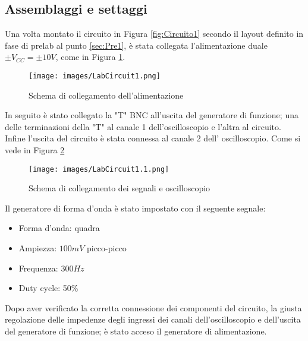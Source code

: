 \subsection{Assemblaggi e settaggi}
Una volta montato il circuito in Figura \ref{fig:Circuito1} secondo il layout definito in fase di prelab al punto \ref{sec:Pre1}, è stata collegata l'alimentazione duale $\pm V_{CC}=\pm10V$, come in Figura \ref{fig:Alimentazione1}. \\
\begin{figure}[H]
    \centering
    \texttt{[image: images/LabCircuit1.png]}
    \caption{Schema di collegamento dell'alimentazione}
    \label{fig:Alimentazione1}
\end{figure}
In seguito è stato collegato la "T" BNC all’uscita del generatore di funzione; una delle terminazioni della "T" al canale 1 dell'oscilloscopio e l'altra al circuito. Infine l'uscita del circuito è stata connessa  al canale 2 dell' oscilloscopio. Come si vede in Figura \ref{fig:LabCircuit1}
\begin{figure}[H]
    \centering
    \texttt{[image: images/LabCircuit1.1.png]}
    \caption{Schema di collegamento dei segnali e oscilloscopio}
    \label{fig:LabCircuit1}
\end{figure}
Il generatore di forma d'onda è stato impostato con il seguente segnale:
\begin{itemize}
    \item Forma d'onda: quadra
    \item Ampiezza: $100mV$ picco-picco
    \item Frequenza: $300Hz$
    \item Duty cycle: 50\%
\end{itemize}
Dopo aver verificato la corretta connessione dei componenti del circuito, la giusta regolazione delle impedenze degli ingressi dei canali dell'oscilloscopio e dell'uscita del generatore di funzione; è stato acceso il generatore di alimentazione.
\clearpage

